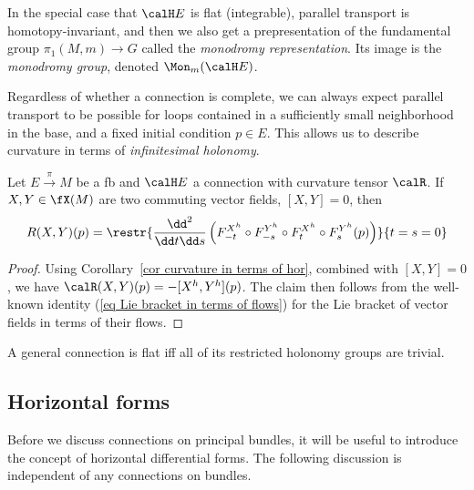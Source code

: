 \begin{defn}
    In the special case that $\calH E$ is flat (integrable), parallel transport is homotopy-invariant, and then we also get a prepresentation of the fundamental group $\pi_1(M,m)\to G$ called the \emph{monodromy representation}. Its image is the \emph{monodromy group}, denoted $\Mon_m(\calH E)$.
\end{defn}

Regardless of whether a connection is complete, we can always expect parallel transport to be possible for loops contained in a sufficiently small neighborhood in the base, and a fixed initial condition $p\in E$. This allows us to describe curvature in terms of \emph{infinitesimal holonomy}.

\begin{prop}
    Let $E\overset{\pi}{\to}M$ be a \gls{fb} and $\calH E$ a connection with curvature tensor $\calR$. If $X,Y\in\fX(M)$ are two commuting vector fields, $[X,Y]=0$, then 
    \[R(X,Y)(p)=\restr{\frac{\dd^2}{\dd t\dd s}\left(
    F^{X^h}_{-t}\circ F^{Y^h}_{-s}\circ F^{X^h}_t\circ F^{Y^h}_s(p)
    \right)}{t=s=0}\]
\end{prop}
\begin{proof}
    Using Corollary~\ref{cor curvature in terms of hor}, combined with $[X,Y]=0$, we have $\calR(X,Y)(p)=-[X^h,Y^h](p)$. The claim then follows from the well-known identity (\ref{eq Lie bracket in terms of flows}) for the Lie bracket of vector fields in terms of their flows.
\end{proof}
\begin{cor}
    A general connection is flat iff all of its restricted holonomy groups are trivial.
\end{cor}






\subsection{Horizontal forms}

Before we discuss connections on principal bundles, it will be useful to introduce the concept of horizontal differential forms. The following discussion is independent of any connections on bundles.

